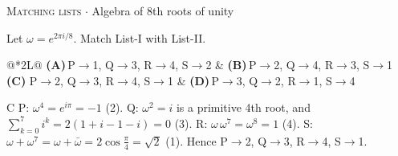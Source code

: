 \documentclass[11pt,a4paper]{article}
\newcommand{\optlabel}[1]{\textbf{(#1)}}
\newcommand{\correctlabel}[1]{\textcolor{okgreen}{\textbf{(#1)}\,\ding{51}}}
\newenvironment{qitem}[1]{\begin{list}{}{\setlength{\leftmargin}{3.3em}\setlength{\labelwidth}{3.1em}%
  \setlength{\labelsep}{0.2em}\setlength{\topsep}{3pt}\setlength{\parsep}{3pt}}\item[\textbf{Q.#1}\hfill]}{\end{list}}
\newcommand{\qsep}{\par\vspace{2pt}{\color{black!15}\hrule}\vspace{4pt}}
\newcommand{\qmeta}[2]{{\footnotesize\color{black!60}\textsc{#1} \;$\cdot$\; #2}\par}
\begin{document}
\begin{qitem}{15}
\qmeta{Matching lists}{Algebra of 8th roots of unity}
Let $\omega = e^{2\pi i/8}$. Match List-I with List-II.
\par\smallskip{}
\par\smallskip\noindent\begin{tabularx}{\linewidth}{@{}*{2}{L}@{}}
\optlabel{A}\,P$\to$1, Q$\to$3, R$\to$4, S$\to$2 & \optlabel{B}\,P$\to$2, Q$\to$4, R$\to$3, S$\to$1 \\[3pt]
\correctlabel{C}\,P$\to$2, Q$\to$3, R$\to$4, S$\to$1 & \optlabel{D}\,P$\to$3, Q$\to$2, R$\to$1, S$\to$4
\end{tabularx}
\end{qitem}
\begin{solbox}{C}
P: $\omega^4 = e^{i\pi} = -1$ (2). Q: $\omega^2 = i$ is a primitive 4th root, and $\sum_{k=0}^{7} i^k = 2(1 + i - 1 - i) = 0$ (3).
R: $\omega\,\omega^7 = \omega^8 = 1$ (4). S: $\omega + \omega^7 = \omega + \bar\omega = 2\cos\frac{\pi}{4} = \sqrt2$ (1).
Hence P$\to$2, Q$\to$3, R$\to$4, S$\to$1.
\end{solbox}
\qsep
\end{document}
